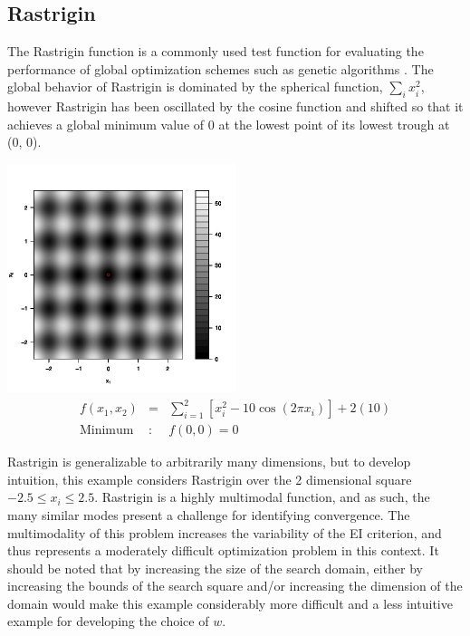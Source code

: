 \documentclass[12pt]{article}
\begin{document}
%
%
\subsection{Rastrigin}
%
%

%
The Rastrigin function is a commonly used test function for evaluating the performance of global optimization schemes such as genetic algorithms \citep{rastCite}.
%
The global behavior of Rastrigin is dominated by the spherical function, $\sum_i x_i^2$, however Rastrigin has been oscillated by the cosine function and shifted so that it achieves a global minimum value of 0 at the lowest point of its lowest trough at (0, 0).

%
%
\begin{center}
        \includegraphics[width=0.5\textwidth]{./figures/rastContourBW.jpg}
        \begin{eqnarray}
        f(x_1, x_2) &=& \sum_{i=1}^2\left[x_i^2-10\cos(2\pi x_i)\right] + 2(10)\\
        \label{rastEq}
        \text{Minimum}&:& f(0, 0)=0\nonumber
        \end{eqnarray}
\end{center}
%
%

%
Rastrigin is generalizable to arbitrarily many dimensions, but to develop intuition, this example considers Rastrigin over the 2 dimensional square $-2.5\le x_i\le 2.5$.
%
Rastrigin is a highly multimodal function, and as such, the many similar modes present a challenge for identifying convergence.
%
The multimodality of this problem increases the variability of the EI criterion, and thus represents a moderately difficult optimization problem in this context. 
%
It should be noted that by increasing the size of the search domain, either by increasing the bounds of the search square and/or increasing the dimension of the domain would make this example considerably more difficult and a less intuitive example for developing the choice of $w$. %
\end{document}
